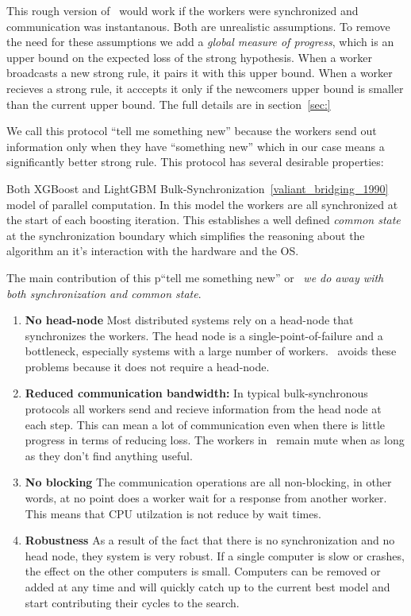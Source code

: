 This rough version of \tmsn\ would work if the workers were
synchronized and communication was instantanous. Both are unrealistic
assumptions. To remove the need for these assumptions we add a {\em
  global measure of progress}, which is an upper bound on the expected
loss of the strong hypothesis. When a worker broadcasts a new strong
rule, it pairs it with this upper bound. When a worker recieves a
strong rule, it acccepts it only if the newcomers upper bound is
smaller than the current upper bound. The full details are in
section~\ref{sec:}

We call this protocol ``tell me something new'' because the workers
send out information only when they have ``something new'' which in
our case means a significantly better strong rule. This protocol has
several desirable properties:

Both XGBoost and LightGBM 
Bulk-Synchronization~\ref{valiant_bridging_1990} model of parallel
computation. In this model the workers are all synchronized at the
start of each boosting iteration. This establishes a well defined {\em
  common state} at the synchronization boundary which simplifies the
reasoning about the algorithm an it's interaction with the hardware
and the OS.

The main contribution of this p``tell me something new'' or
\tmsn\ {\em we do away with both synchronization and common state}.

\begin{enumerate}
\item {\bf No head-node} Most distributed systems rely on a head-node
  that synchronizes the workers. The head node is a
  single-point-of-failure and a bottleneck, especially systems with a
  large number of workers. \tmsn\ avoids these problems because it
  does not require a head-node.
\item {\bf Reduced communication bandwidth:} In typical bulk-synchronous
  protocols all workers send and recieve information from the head
  node at each step. This can mean a lot of communication even when
  there is little progress in terms of reducing loss. The workers in
  \tmsn\ remain mute when as long as they don't find anything useful.
\item {\bf No blocking} The communication operations are all
  non-blocking, in other words, at no point does a worker wait for a
  response from another worker. This means that CPU utilzation is not
  reduce by wait times.
\item {\bf Robustness} As a result of the fact that there is no
  synchronization and no head node, they system is very robust. If a
  single computer is slow or crashes, the effect on the other
  computers is small. Computers can be removed or added at any time
  and will quickly catch up to the current best model and start
  contributing their cycles to the search.
\end{enumerate}


